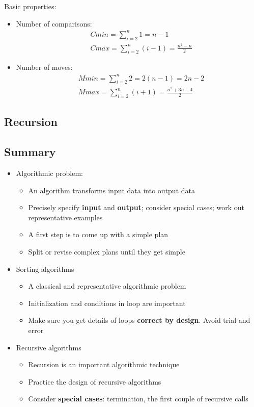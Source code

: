 Basic properties:
\begin{itemize}
    \item Number of comparisons:
    \begin{align*}
        &Cmin = \sum_{i=2}^n 1 = n-1 \\
        &Cmax = \sum_{i=2}^n (i-1)=\frac{n^2-n}{2}
    \end{align*}
    \item Number of moves:
    \begin{align*}
        &Mmin = \sum_{i=2}^n 2 = 2(n-1) = 2n-2 \\
        &Mmax = \sum_{i=2}^n (i+1)=\frac{n^2 + 3n-4}{2}
    \end{align*}
\end{itemize}

\subsection{Recursion}

\subsection{Summary}
\begin{itemize}
    \item Algorithmic problem:
    \begin{itemize}
        \item An algorithm transforms input data into output data
        \item Precisely specify \textbf{input} and \textbf{output}; consider special cases; work out representative examples
        \item A first step is to come up with a simple plan
        \item Split or revise complex plans until they get simple
    \end{itemize}
    \item Sorting algorithms
    \begin{itemize}
        \item A classical and representative algorithmic problem
        \item Initialization and conditions in loop are important
        \item Make sure you get details of loops \textbf{correct by design}. Avoid trial and error
    \end{itemize}
    \item Recursive algorithms
    \begin{itemize}
        \item Recursion is an important algorithmic technique
        \item Practice the design of recursive algorithms
        \item Consider \textbf{special cases}: termination, the first couple of recursive calls
    \end{itemize}
\end{itemize}